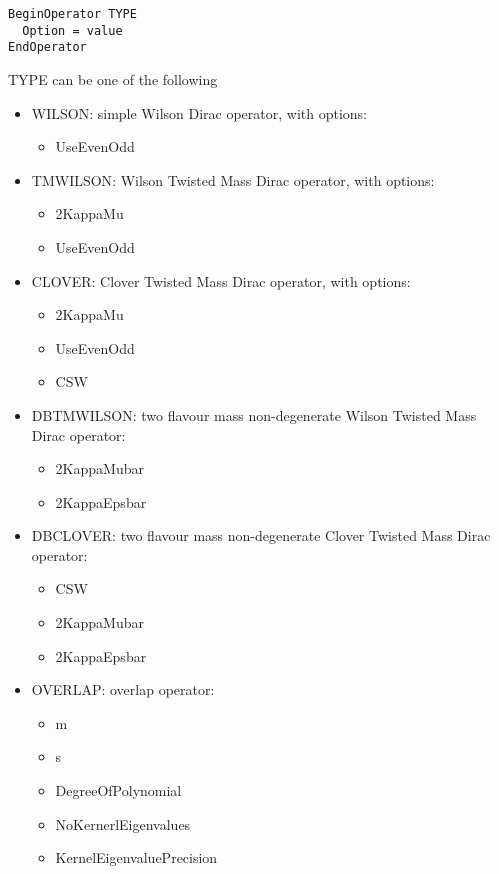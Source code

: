 \begin{verbatim}
BeginOperator TYPE
  Option = value
EndOperator
\end{verbatim}
{\ttfamily TYPE} can be one of the following
\begin{itemize}
\item {\ttfamily WILSON}: simple Wilson Dirac operator, with options:
  \begin{itemize}
  \item {\ttfamily UseEvenOdd}
  \end{itemize}
\item {\ttfamily TMWILSON}: Wilson Twisted Mass Dirac operator, with
  options:
  \begin{itemize}
  \item {\ttfamily 2KappaMu}
  \item {\ttfamily UseEvenOdd}
  \end{itemize}
\item {\ttfamily CLOVER}: Clover Twisted Mass Dirac operator, with
  options:
  \begin{itemize}
  \item {\ttfamily 2KappaMu}
  \item {\ttfamily UseEvenOdd}
  \item {\ttfamily CSW}
  \end{itemize}
\item {\ttfamily DBTMWILSON}: two flavour mass non-degenerate Wilson
  Twisted Mass Dirac operator:
  \begin{itemize}
  \item {\ttfamily 2KappaMubar}
  \item {\ttfamily 2KappaEpsbar}
  \end{itemize}
\item {\ttfamily DBCLOVER}: two flavour mass non-degenerate Clover
  Twisted Mass Dirac operator:
  \begin{itemize}
  \item {\ttfamily CSW}
  \item {\ttfamily 2KappaMubar}
  \item {\ttfamily 2KappaEpsbar}
  \end{itemize}
\item {\ttfamily OVERLAP}: overlap  operator:
  \begin{itemize}
  \item {\ttfamily m}
  \item {\ttfamily s}
  \item {\ttfamily DegreeOfPolynomial}
  \item {\ttfamily NoKernerlEigenvalues}
  \item {\ttfamily KernelEigenvaluePrecision}
  \end{itemize}
\end{itemize}
